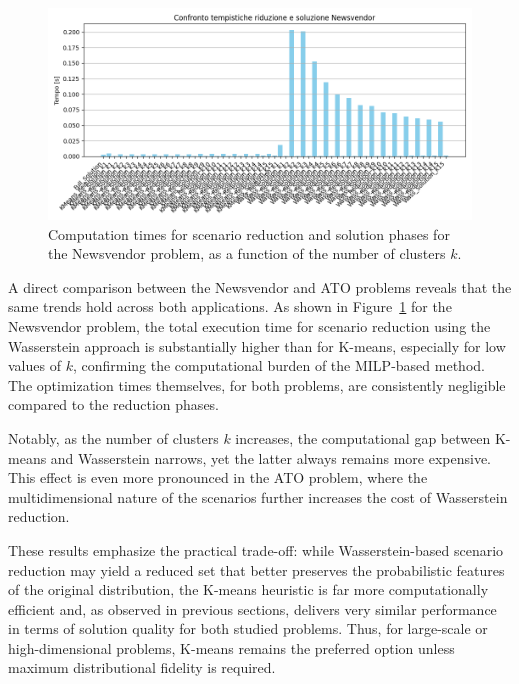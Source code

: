 \documentclass[a4paper,12pt]{article}
\begin{document}
	 \begin{figure}[H]
		     \centering
		     \includegraphics[width=1\textwidth]{../immagini/tempi_nv.png}
		     \caption{Computation times for scenario reduction and solution phases for the Newsvendor problem, as a function of the number of clusters $k$.}
		     \label{fig:timing-nv}
		 \end{figure}
	
	\noindent
	A direct comparison between the Newsvendor and ATO problems reveals that the same trends hold across both applications. As shown in Figure~\ref{fig:timing-nv} for the Newsvendor problem, the total execution time for scenario reduction using the Wasserstein approach is substantially higher than for K-means, especially for low values of $k$, confirming the computational burden of the MILP-based method. The optimization times themselves, for both problems, are consistently negligible compared to the reduction phases.
	
	Notably, as the number of clusters $k$ increases, the computational gap between K-means and Wasserstein narrows, yet the latter always remains more expensive. This effect is even more pronounced in the ATO problem, where the multidimensional nature of the scenarios further increases the cost of Wasserstein reduction.
	
	These results emphasize the practical trade-off: while Wasserstein-based scenario reduction may yield a reduced set that better preserves the probabilistic features of the original distribution, the K-means heuristic is far more computationally efficient and, as observed in previous sections, delivers very similar performance in terms of solution quality for both studied problems. Thus, for large-scale or high-dimensional problems, K-means remains the preferred option unless maximum distributional fidelity is required.
	
	
	\newpage
	
\end{document}
